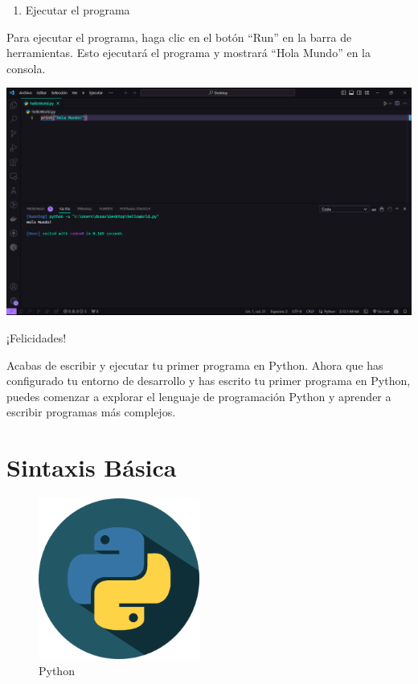\documentclass[
  a4paper,
  DIV=11,
  numbers=noendperiod,
  onepage,
  openany]{scrreprt}
\providecommand{\tightlist}{%
  \setlength{\itemsep}{0pt}\setlength{\parskip}{0pt}}\usepackage{longtable,booktabs,array}
\begin{document}
\begin{enumerate}
\def\labelenumi{\arabic{enumi}.}
\setcounter{enumi}{3}
\tightlist
\item
  Ejecutar el programa
\end{enumerate}

Para ejecutar el programa, haga clic en el botón ``Run'' en la barra de
herramientas. Esto ejecutará el programa y mostrará ``Hola Mundo'' en la
consola.

\includegraphics{unidades/unidad2/images/paste-9.png}

¡Felicidades!

Acabas de escribir y ejecutar tu primer programa en Python. Ahora que
has configurado tu entorno de desarrollo y has escrito tu primer
programa en Python, puedes comenzar a explorar el lenguaje de
programación Python y aprender a escribir programas más complejos.

\chapter{Sintaxis Básica}\label{sintaxis-buxe1sica}

\begin{figure}[H]

{\centering \includegraphics[width=2.08333in,height=\textheight]{unidades/unidad2/../../images/python-logo.png}

}

\caption{Python}

\end{figure}%
\end{document}
